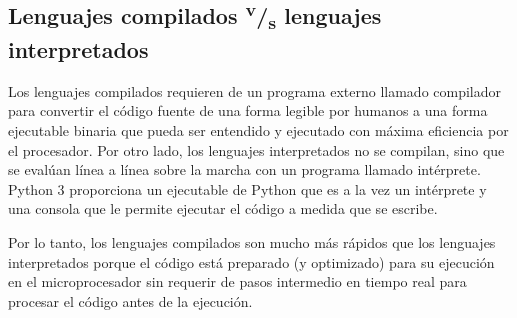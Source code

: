 \subsection{Lenguajes compilados \textsuperscript{v}/\textsubscript{s} lenguajes interpretados}%
\label{sec:uPy-interpreter}
Los lenguajes compilados requieren de un programa externo llamado compilador para convertir el código fuente de una forma legible por humanos a una forma ejecutable binaria que pueda ser entendido y ejecutado con máxima eficiencia por el procesador.
Por otro lado, los lenguajes interpretados no se compilan, sino que se evalúan línea a línea sobre la marcha con un programa llamado intérprete.
Python 3 proporciona un ejecutable de Python que es a la vez un intérprete y una consola que le permite ejecutar el código a medida que se escribe.

Por lo tanto, los lenguajes compilados son mucho más rápidos que los lenguajes interpretados porque el código está preparado (y optimizado) para su ejecución en el microprocesador sin requerir de pasos intermedio en tiempo real para procesar el código antes de la ejecución.
